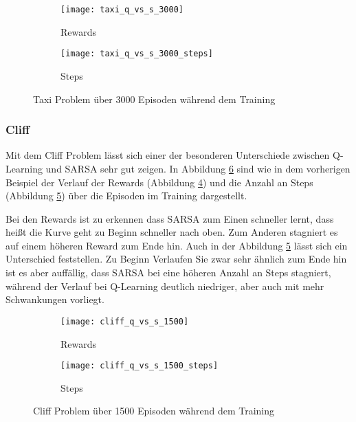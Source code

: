 \begin{figure}[H]
    \centering
    \begin{subfigure}{.5\textwidth}
      \centering
      \texttt{[image: taxi\_q\_vs\_s\_3000]}
      \caption{Rewards}
      \label{fig:taxi_rew}
    \end{subfigure}%
    \begin{subfigure}{.5\textwidth}
      \centering
      \texttt{[image: taxi\_q\_vs\_s\_3000\_steps]}
      \caption{Steps}
      \label{fig:taxi_step}
    \end{subfigure}
    \caption{Taxi Problem über 3000 Episoden während dem Training}
    \label{fig:taxi_train}
\end{figure}

\subsubsection{Cliff}

Mit dem Cliff Problem lässt sich einer der besonderen Unterschiede zwischen Q-Learning und SARSA sehr gut zeigen. In Abbildung \ref{fig:cliff_train} sind wie in dem vorherigen Beispiel der Verlauf der Rewards (Abbildung \ref{fig:cliff_rew}) und die Anzahl an Steps (Abbildung \ref{fig:cliff_step}) über die Episoden im Training dargestellt.

Bei den Rewards ist zu erkennen dass SARSA zum Einen schneller lernt, dass heißt die Kurve geht zu Beginn schneller nach oben. Zum Anderen stagniert es auf einem höheren Reward zum Ende hin. Auch in der Abbildung \ref{fig:cliff_step} lässt sich ein Unterschied feststellen. Zu Beginn Verlaufen Sie zwar sehr ähnlich zum Ende hin ist es aber auffällig, dass SARSA bei eine höheren Anzahl an Steps stagniert, während der Verlauf bei Q-Learning deutlich niedriger, aber auch mit mehr Schwankungen vorliegt.




\begin{figure}[H]
    \centering
    \begin{subfigure}{.5\textwidth}
      \centering
      \texttt{[image: cliff\_q\_vs\_s\_1500]}
      \caption{Rewards}
      \label{fig:cliff_rew}
    \end{subfigure}%
    \begin{subfigure}{.5\textwidth}
      \centering
      \texttt{[image: cliff\_q\_vs\_s\_1500\_steps]}
      \caption{Steps}
      \label{fig:cliff_step}
    \end{subfigure}
    \caption{Cliff Problem über 1500 Episoden während dem Training}
    \label{fig:cliff_train}
\end{figure}

